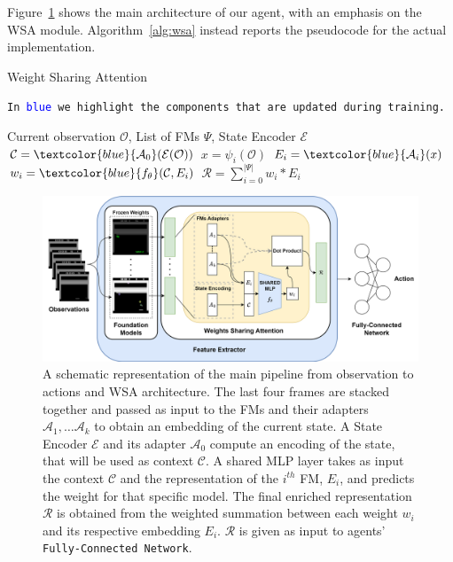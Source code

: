 Figure~\ref{fig:main_architecture} shows the main architecture of our agent, with an emphasis on the WSA module.
Algorithm~\ref{alg:wsa} instead reports the pseudocode for the actual implementation.

\begin{algorithm}[ht]
    \caption{Weight Sharing Attention}\label{alg:wsa}
    \texttt{In \textcolor{blue}{blue} we highlight the components that are updated during training.}\\
    \begin{algorithmic}[1]
        \Require Current observation $\mathcal{O}$, List of FMs $\Psi$, State Encoder $\mathcal{E}$
        \State $\mathcal{C} = \textcolor{blue}{\mathcal{A}_0}(\mathcal{E}(\mathcal{O}))$ 
            \State $x = \psi_i(\mathcal{O})$ 
            \State $E_i = \textcolor{blue}{\mathcal{A}_i}(x)$ 
            \State $w_i = \textcolor{blue}{f_\theta}(\mathcal{C}, E_i)$ 
        \EndFor
        \State $\mathcal{R} = \sum_{i=0}^{|\Psi|} w_i * E_i$ 
    \end{algorithmic}
\end{algorithm}



\begin{figure}[ht]
    \begin{center}
        \includegraphics[width=1\textwidth]{images/main_architecture2}
    \end{center}
    \caption{A schematic representation of the main pipeline from observation to actions and WSA architecture. The last four frames are stacked together and passed as input to the FMs and their adapters $\mathcal{A}_1, \dots \mathcal{A}_k$ to obtain an embedding of the current state. A State Encoder $\mathcal{E}$ and its adapter $\mathcal{A}_0$ compute an encoding of the state, that will be used as context $\mathcal{C}$. A shared MLP layer takes as input the context $\mathcal{C}$ and the representation of the $i^{th}$ FM, $E_i$, and predicts the weight for that specific model. The final enriched representation $\mathcal{R}$ is obtained from the weighted summation between each weight $w_i$ and its respective embedding $E_i$. $\mathcal{R}$ is given as input to agents' \texttt{Fully-Connected Network}.}
    \label{fig:main_architecture}
\end{figure}

